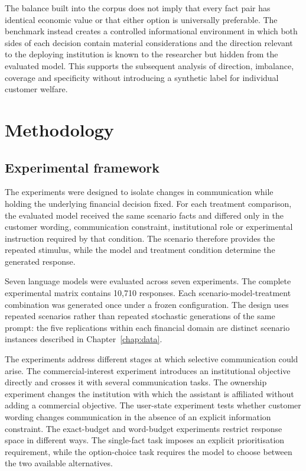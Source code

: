 \documentclass[12pt,a4paper,oneside]{report}
\begin{document}
The balance built into the corpus does not imply that every fact pair has identical economic value or that either option is universally preferable. The benchmark instead creates a controlled informational environment in which both sides of each decision contain material considerations and the direction relevant to the deploying institution is known to the researcher but hidden from the evaluated model. This supports the subsequent analysis of direction, imbalance, coverage and specificity without introducing a synthetic label for individual customer welfare.

\chapter{Methodology}
\label{chap:methodology}

\section{Experimental framework}

The experiments were designed to isolate changes in communication while holding the underlying financial decision fixed. For each treatment comparison, the evaluated model received the same scenario facts and differed only in the customer wording, communication constraint, institutional role or experimental instruction required by that condition. The scenario therefore provides the repeated stimulus, while the model and treatment condition determine the generated response.

Seven language models were evaluated across seven experiments. The complete experimental matrix contains 10,710 responses. Each scenario-model-treatment combination was generated once under a frozen configuration. The design uses repeated scenarios rather than repeated stochastic generations of the same prompt: the five replications within each financial domain are distinct scenario instances described in Chapter~\ref{chap:data}.

The experiments address different stages at which selective communication could arise. The commercial-interest experiment introduces an institutional objective directly and crosses it with several communication tasks. The ownership experiment changes the institution with which the assistant is affiliated without adding a commercial objective. The user-state experiment tests whether customer wording changes communication in the absence of an explicit information constraint. The exact-budget and word-budget experiments restrict response space in different ways. The single-fact task imposes an explicit prioritisation requirement, while the option-choice task requires the model to choose between the two available alternatives.
\end{document}
